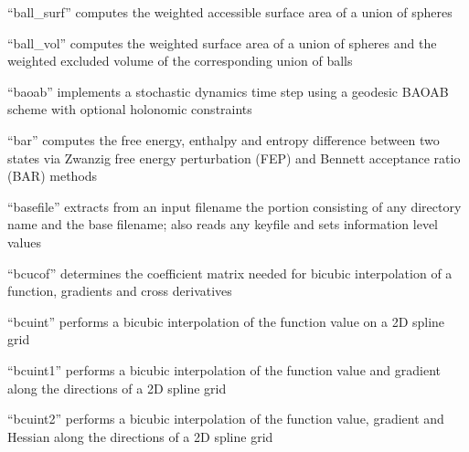 \documentclass[letterpaper,11pt,english]{sphinxmanual}
\begin{document}
\sphinxAtStartPar
{}

\sphinxAtStartPar
“ball\_surf” computes the weighted accessible surface area of a union of spheres

\sphinxAtStartPar
{}

\sphinxAtStartPar
“ball\_vol” computes the weighted surface area of a union of spheres and the weighted excluded volume of the corresponding union of balls

\sphinxAtStartPar
{}

\sphinxAtStartPar
“baoab” implements a stochastic dynamics time step using a geodesic BAOAB scheme with optional holonomic constraints

\sphinxAtStartPar
{}

\sphinxAtStartPar
“bar” computes the free energy, enthalpy and entropy difference between two states via Zwanzig free energy perturbation (FEP) and Bennett acceptance ratio (BAR) methods

\sphinxAtStartPar
{}

\sphinxAtStartPar
{}

\sphinxAtStartPar
“basefile” extracts from an input filename the portion consisting of any directory name and the base filename; also reads any keyfile and sets information level values

\sphinxAtStartPar
{}

\sphinxAtStartPar
“bcucof” determines the coefficient matrix needed for bicubic interpolation of a function, gradients and cross derivatives

\sphinxAtStartPar
{}

\sphinxAtStartPar
“bcuint” performs a bicubic interpolation of the function value on a 2D spline grid

\sphinxAtStartPar
{}

\sphinxAtStartPar
“bcuint1” performs a bicubic interpolation of the function value and gradient along the directions of a 2D spline grid

\sphinxAtStartPar
{}

\sphinxAtStartPar
“bcuint2” performs a bicubic interpolation of the function value, gradient and Hessian along the directions of a 2D spline grid
\end{document}
